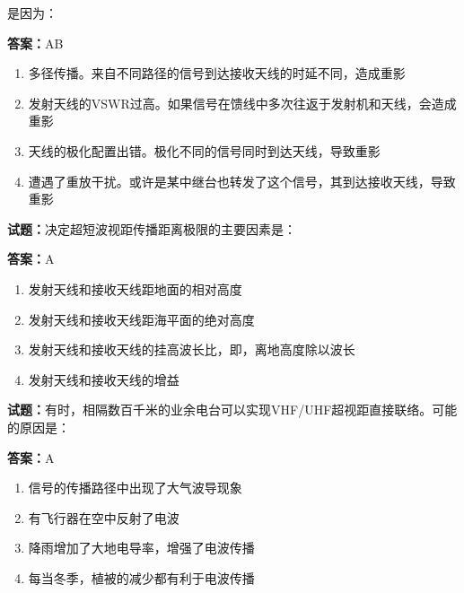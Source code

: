 \documentclass{ctexbook}
\begin{document}
是因为： 

\textbf{答案：}AB 

\begin{enumerate}[leftmargin=3em]
  \item 多径传播。来自不同路径的信号到达接收天线的时延不同，造成重影 

  \item 发射天线的VSWR过高。如果信号在馈线中多次往返于发射机和天线，会造成重影 

  \item 天线的极化配置出错。极化不同的信号同时到达天线，导致重影 

  \item 遭遇了重放干扰。或许是某中继台也转发了这个信号，其到达接收天线，导致重影 

\end{enumerate}





\vspace{1em}

\textbf{试题：}决定超短波视距传播距离极限的主要因素是： 

\textbf{答案：}A 

\begin{enumerate}[leftmargin=3em]
  \item 发射天线和接收天线距地面的相对高度 

  \item 发射天线和接收天线距海平面的绝对高度 

  \item 发射天线和接收天线的挂高波长比，即，离地高度除以波长 

  \item 发射天线和接收天线的增益 

\end{enumerate}





\vspace{1em}

\textbf{试题：}有时，相隔数百千米的业余电台可以实现VHF/UHF超视距直接联络。可能的原因是： 

\textbf{答案：}A 

\begin{enumerate}[leftmargin=3em]
  \item 信号的传播路径中出现了大气波导现象 

  \item 有飞行器在空中反射了电波 

  \item 降雨增加了大地电导率，增强了电波传播 

  \item 每当冬季，植被的减少都有利于电波传播 

\end{enumerate}
\end{document}
